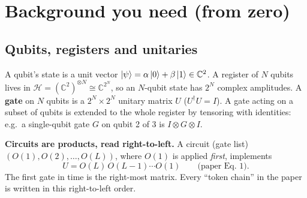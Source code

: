 \documentclass[11pt,a4paper]{article}
\begin{document}
\section{Background you need (from zero)}
\subsection{Qubits, registers and unitaries}
A qubit's state is a unit vector $\ket{\psi}=\alpha\ket0+\beta\ket1\in\mathbb C^2$. A register of $N$ qubits lives in
$\mathcal H=(\mathbb C^2)^{\otimes N}\cong\mathbb C^{2^N}$, so an $N$-qubit state has $2^N$ complex amplitudes. A
\textbf{gate} on $N$ qubits is a $2^N\times2^N$ unitary matrix $U$ ($U^\dagger U=I$). A gate acting on a subset of qubits
is extended to the whole register by tensoring with identities: e.g.\ a single-qubit gate $G$ on qubit 2 of 3 is
$I\otimes G\otimes I$.

\textbf{Circuits are products, read right-to-left.} A circuit (gate list) $(O(1),O(2),\dots,O(L))$, where $O(1)$ is
applied \emph{first}, implements
\[
U = O(L)\,O(L-1)\cdots O(1)\qquad\text{(paper Eq.~1)}.
\]
The first gate in time is the right-most matrix. Every ``token chain'' in the paper is written in this
right-to-left order.
\end{document}
